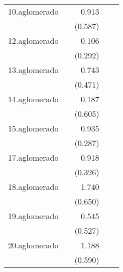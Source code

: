 {\begin{longtable}{l*{4}{D{.}{.}{-1}}}
\addlinespace
10.aglomerado&                     &       0.913         &                     &                     \\
            &                     &     (0.587)         &                     &                     \\
\addlinespace
12.aglomerado&                     &       0.106         &                     &                     \\
            &                     &     (0.292)         &                     &                     \\
\addlinespace
13.aglomerado&                     &       0.743         &                     &                     \\
            &                     &     (0.471)         &                     &                     \\
\addlinespace
14.aglomerado&                     &       0.187         &                     &                     \\
            &                     &     (0.605)         &                     &                     \\
\addlinespace
15.aglomerado&                     &       0.935\sym{**} &                     &                     \\
            &                     &     (0.287)         &                     &                     \\
\addlinespace
17.aglomerado&                     &       0.918\sym{**} &                     &                     \\
            &                     &     (0.326)         &                     &                     \\
\addlinespace
18.aglomerado&                     &       1.740\sym{**} &                     &                     \\
            &                     &     (0.650)         &                     &                     \\
\addlinespace
19.aglomerado&                     &       0.545         &                     &                     \\
            &                     &     (0.527)         &                     &                     \\
\addlinespace
20.aglomerado&                     &       1.188\sym{*}  &                     &                     \\
            &                     &     (0.590)         &                     &                     \\

\end{longtable}}
